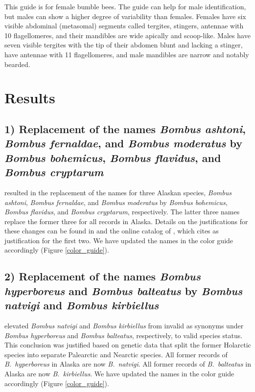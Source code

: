 \begin{multicols}{2}
This guide is for female bumble bees. The guide can help for male identification, but males can show a higher degree of variability than females. Females have six visible abdominal (metasomal) segments called tergites, stingers, antennae with 10 flagellomeres, and their mandibles are wide apically and scoop-like. Males have seven visible tergites with the tip of their abdomen blunt and lacking a stinger, have antennae with 11 flagellomeres, and male mandibles are narrow and notably bearded.  

\section{Results}

\setcounter{subsection}{1}
\renewcommand\thesubsection{\arabic{section}}

\subsection{1) Replacement of the names \textit{Bombus ashtoni}, \textit{Bombus fernaldae}, and \textit{Bombus moderatus} by \textit{Bombus bohemicus}, \textit{Bombus flavidus}, and \textit{Bombus cryptarum}}

\citet{Williamsetal2014} resulted in the replacement of the names for three Alaskan species, \textit{Bombus ashtoni}, \textit{Bombus fernaldae}, and \textit{Bombus moderatus} by \textit{Bombus bohemicus}, \textit{Bombus flavidus}, and \textit{Bombus cryptarum}, respectively. The latter three names replace the former three for all records in Alaska. Details on the justifications for these changes can be found in \citet{Williamsetal2014} and the online catalog of \citet{Williams2020}, which cites \citet{Cameronetal2007} as justification for the first two. We have updated the names in the color guide accordingly (Figure \ref{color_guide}).

\subsection{2) Replacement of the names \textit{Bombus hyperboreus} and \textit{Bombus balteatus} by \textit{Bombus natvigi} and \textit{Bombus kirbiellus}}

\citet{Williamsetal2015} elevated \textit{Bombus natvigi} and \textit{Bombus kirbiellus} from invalid as synonyms under \textit{Bombus hyperboreus} and \textit{Bombus balteatus}, respectively, to valid species status. This conclusion was justified based on genetic data that split the former Holarctic species into separate Palearctic and Nearctic species. All former records of \textit{B.\ hyperboreus} in Alaska are now \textit{B.\ natvigi}. All former records of \textit{B.\ balteatus} in Alaska are now \textit{B.\ kirbiellus}. We have updated the names in the color guide accordingly (Figure \ref{color_guide}).


\end{multicols}
